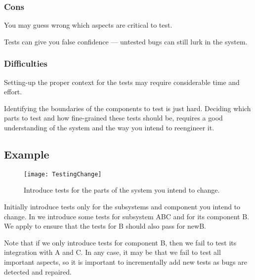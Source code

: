 \documentclass[a4paper,10pt,twoside]{book}
\begin{document}
\subsubsection*{Cons}

\begin{bulletlist}
\item You may guess wrong which aspects are critical to test.
\item Tests can give you false confidence --- untested bugs can still lurk in the system.
\end{bulletlist}

\subsubsection*{Difficulties}

\begin{bulletlist}
\item Setting-up the proper context for the tests may require considerable time and effort.
\item Identifying the boundaries of the components to test is just hard. Deciding which parts to test and how fine-grained these tests should be, requires a good understanding of the system and the way you intend to reengineer it.
\end{bulletlist}

\subsection*{Example}

\begin{figure}[h]
\begin{center}
\texttt{[image: TestingChange]}
\caption{Introduce tests for the parts of the system you intend to change.}
\end{center}
\end{figure}

Initially introduce tests only for the subsystems and component you intend to change. In  we introduce some tests for subsystem ABC and for its component B. We apply  to ensure that the tests for B should also pass for newB.

Note that if we only introduce tests for component B, then we fail to test its integration with A and C. In any case, it may be that we fail to test all important aspects, so it is important to incrementally add new tests as bugs are detected and repaired.
\end{document}
